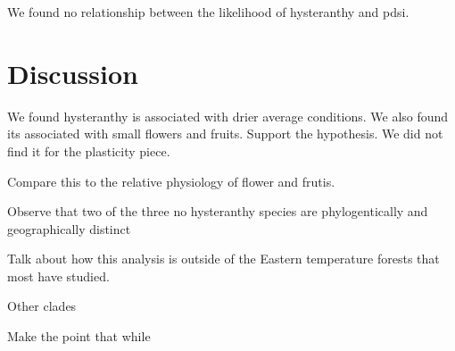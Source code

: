 \documentclass{article}\usepackage[]{graphicx}\usepackage[]{color}
\begin{document}
We found no relationship between the likelihood of hysteranthy and pdsi.




\section*{Discussion}
We found hysteranthy is associated with drier average conditions. We also found its associated with small flowers and fruits. Support the hypothesis.
We did not find it for the plasticity piece.

Compare this to the relative physiology of flower and frutis.

Observe that two of the three no hysteranthy species are phylogentically and geographically distinct

Talk about how this analysis is outside of the Eastern temperature forests that most have studied. 

Other clades

Make the point that while
\end{document}
